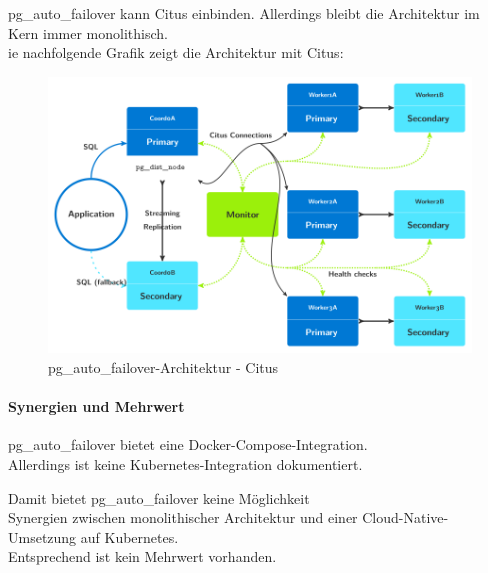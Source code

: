 \begin{flushleft}
    pg\_auto\_failover kann Citus einbinden.
    Allerdings bleibt die Architektur im Kern immer monolithisch.\\
    ie nachfolgende Grafik zeigt die Architektur mit Citus\cite{3FVHLIFE}:
    \begin{figure}[H]
        \centering
        \includegraphics[width=0.75\linewidth]{source/implementation/evaluation/postgresql_ha_solutions/pg_auto_failover/pg_auto-failover_arch-citus}
        \caption{pg\_auto\_failover-Architektur - Citus}
        \label{fig:pg_auto-failover_arch-citus}
    \end{figure}
\end{flushleft}
\begin{flushleft}
    \paragraph{Synergien und Mehrwert}
    pg\_auto\_failover bietet eine Docker-Compose-Integration.\\
    Allerdings ist keine Kubernetes-Integration dokumentiert.
\end{flushleft}
\begin{flushleft}
    Damit bietet pg\_auto\_failover keine Möglichkeit\\
    Synergien zwischen monolithischer Architektur und einer Cloud-Native-Umsetzung auf Kubernetes.\\
    Entsprechend ist kein Mehrwert vorhanden.
\end{flushleft}